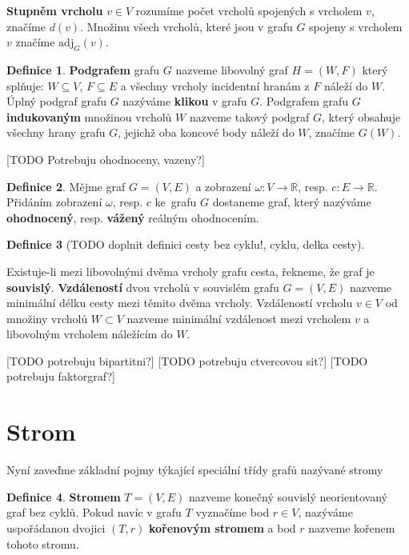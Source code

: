 \documentclass[11pt,american,czech,oneside]{book}
\theoremstyle{plain}
\theoremstyle{definition}
\newtheorem{definition}{Definice}
\begin{document}
\textbf{Stupněm vrcholu} $v \in V$ rozumíme počet vrcholů spojených s vrcholem $v$, značíme $d(v)$. Množinu všech vrcholů, které jsou v grafu $G$ spojeny s vrcholem $v$ značíme $\mathrm{adj}_G(v)$.

\begin{definition}
  \textbf{Podgrafem} grafu $G$ nazveme libovolný graf $H=(W,F)$ který splňuje: $W\subseteq V$, $F\subseteq E$ a všechny vrcholy incidentní hranám z $F$ náleží do $W$. Úplný podgraf grafu $G$ nazýváme \textbf{klikou} v grafu $G$. Podgrafem grafu $G$ \textbf{indukovaným} množinou vrcholů $W$ nazveme takový podgraf $G$, který obsahuje všechny hrany grafu $G$, jejichž oba koncové body náleží do $W$, značíme $G(W)$.
\end{definition}


[TODO Potrebuju ohodnoceny, vazeny?]
\begin{definition}
  Mějme graf $G=(V,E)$ a zobrazení $\omega:V \rightarrow \mathbb{R}$, resp. $c: E \rightarrow \mathbb{R}$. Přidáním zobrazení $\omega$, resp. $c$ ke~grafu $G$ dostaneme graf, který nazýváme \textbf{ohodnocený}, resp. \textbf{vážený} reálným ohodnocením.
\end{definition}

\begin{definition}
  [TODO doplnit definici cesty bez cyklu!, cyklu, delka cesty]
\end{definition}

Existuje-li mezi libovolnými dvěma vrcholy grafu cesta, řekneme, že graf je \textbf{souvislý}.
\textbf{Vzdáleností} dvou vrcholů v souvislém grafu $G=(V,E)$ nazveme minimální délku cesty mezi těmito dvěma vrcholy. Vzdáleností vrcholu $v \in V$ od množiny vrcholů $W \subset V$ nazveme minimální vzdálenost mezi vrcholem $v$ a libovolným vrcholem náležícím do $W$. 

[TODO potrebuju bipartitni?]
[TODO potrebuju ctvercovou sit?]
[TODO potrebuju faktorgraf?]

\section{Strom}

Nyní zaveďme základní pojmy týkající speciální třídy grafů nazývané stromy \cite{koub:11}

\begin{definition}
  \textbf{Stromem} $T=(V,E)$ nazveme konečný souvislý neorientovaný graf bez cyklů. Pokud navíc v grafu $T$ vyznačíme bod $r \in V$, nazýváme uspořádanou dvojici $(T,r)$ \textbf{kořenovým stromem} a bod $r$ nazveme kořenem tohoto stromu.
\end{definition}
\end{document}
